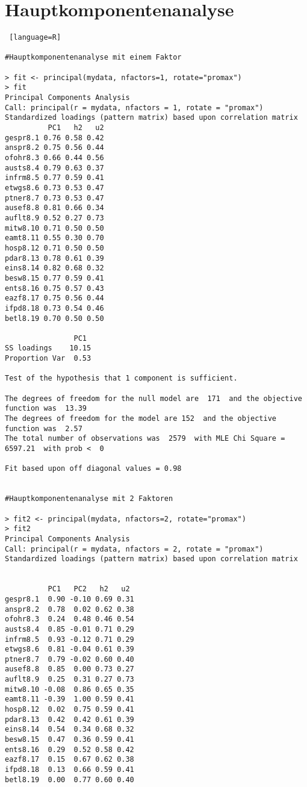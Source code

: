 \section{Hauptkomponentenanalyse}
\label{C}
\begin{lstlisting} [language=R]

#Hauptkomponentenanalyse mit einem Faktor

> fit <- principal(mydata, nfactors=1, rotate="promax")
> fit
Principal Components Analysis
Call: principal(r = mydata, nfactors = 1, rotate = "promax")
Standardized loadings (pattern matrix) based upon correlation matrix
          PC1   h2   u2
gespr8.1 0.76 0.58 0.42
anspr8.2 0.75 0.56 0.44
ofohr8.3 0.66 0.44 0.56
austs8.4 0.79 0.63 0.37
infrm8.5 0.77 0.59 0.41
etwgs8.6 0.73 0.53 0.47
ptner8.7 0.73 0.53 0.47
ausef8.8 0.81 0.66 0.34
auflt8.9 0.52 0.27 0.73
mitw8.10 0.71 0.50 0.50
eamt8.11 0.55 0.30 0.70
hosp8.12 0.71 0.50 0.50
pdar8.13 0.78 0.61 0.39
eins8.14 0.82 0.68 0.32
besw8.15 0.77 0.59 0.41
ents8.16 0.75 0.57 0.43
eazf8.17 0.75 0.56 0.44
ifpd8.18 0.73 0.54 0.46
betl8.19 0.70 0.50 0.50

                PC1
SS loadings    10.15
Proportion Var  0.53

Test of the hypothesis that 1 component is sufficient.

The degrees of freedom for the null model are  171  and the objective function was  13.39
The degrees of freedom for the model are 152  and the objective function was  2.57 
The total number of observations was  2579  with MLE Chi Square =  6597.21  with prob <  0 

Fit based upon off diagonal values = 0.98


#Hauptkomponentenanalyse mit 2 Faktoren

> fit2 <- principal(mydata, nfactors=2, rotate="promax")
> fit2
Principal Components Analysis
Call: principal(r = mydata, nfactors = 2, rotate = "promax")
Standardized loadings (pattern matrix) based upon correlation matrix


          PC1   PC2   h2   u2
gespr8.1  0.90 -0.10 0.69 0.31
anspr8.2  0.78  0.02 0.62 0.38
ofohr8.3  0.24  0.48 0.46 0.54
austs8.4  0.85 -0.01 0.71 0.29
infrm8.5  0.93 -0.12 0.71 0.29
etwgs8.6  0.81 -0.04 0.61 0.39
ptner8.7  0.79 -0.02 0.60 0.40
ausef8.8  0.85  0.00 0.73 0.27
auflt8.9  0.25  0.31 0.27 0.73
mitw8.10 -0.08  0.86 0.65 0.35
eamt8.11 -0.39  1.00 0.59 0.41
hosp8.12  0.02  0.75 0.59 0.41
pdar8.13  0.42  0.42 0.61 0.39
eins8.14  0.54  0.34 0.68 0.32
besw8.15  0.47  0.36 0.59 0.41
ents8.16  0.29  0.52 0.58 0.42
eazf8.17  0.15  0.67 0.62 0.38
ifpd8.18  0.13  0.66 0.59 0.41
betl8.19  0.00  0.77 0.60 0.40


\end{lstlisting}

